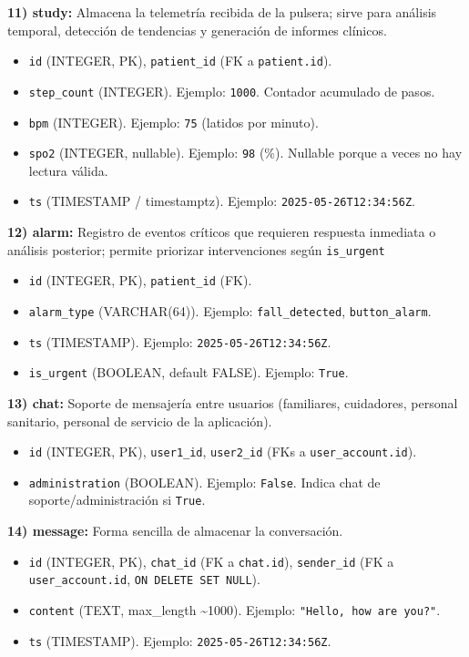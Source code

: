 \documentclass[12pt, a4paper]{article}
\begin{document}
\textbf{11) study:} Almacena la telemetría recibida de la pulsera; sirve para análisis temporal, detección de tendencias y generación de informes clínicos.
\begin{itemize}
	\item \texttt{id} (INTEGER, PK), \texttt{patient\_id} (FK a \texttt{patient.id}).
	\item \texttt{step\_count} (INTEGER). Ejemplo: \texttt{1000}. Contador acumulado de pasos.
	\item \texttt{bpm} (INTEGER). Ejemplo: \texttt{75} (latidos por minuto).
	\item \texttt{spo2} (INTEGER, nullable). Ejemplo: \texttt{98} (\%). Nullable porque a veces no hay lectura válida.
	\item \texttt{ts} (TIMESTAMP / timestamptz). Ejemplo: \texttt{2025-05-26T12:34:56Z}.
\end{itemize}

\textbf{12) alarm:} Registro de eventos críticos que requieren respuesta inmediata o análisis posterior; permite priorizar intervenciones según \texttt{is\_urgent}
\begin{itemize}
	\item \texttt{id} (INTEGER, PK), \texttt{patient\_id} (FK).
	\item \texttt{alarm\_type} (VARCHAR(64)). Ejemplo: \texttt{fall\_detected}, \texttt{button\_alarm}.
	\item \texttt{ts} (TIMESTAMP). Ejemplo: \texttt{2025-05-26T12:34:56Z}.
	\item \texttt{is\_urgent} (BOOLEAN, default FALSE). Ejemplo: \texttt{True}.
\end{itemize}


\textbf{13) chat:} Soporte de mensajería entre usuarios (familiares, cuidadores, personal sanitario, personal de servicio de la aplicación). 
\begin{itemize}
	\item \texttt{id} (INTEGER, PK), \texttt{user1\_id}, \texttt{user2\_id} (FKs a \texttt{user\_account.id}).
	\item \texttt{administration} (BOOLEAN). Ejemplo: \texttt{False}. Indica chat de soporte/administración si \texttt{True}.
\end{itemize}


\textbf{14) message:} Forma sencilla de almacenar la conversación.
\begin{itemize}
	\item \texttt{id} (INTEGER, PK), \texttt{chat\_id} (FK a \texttt{chat.id}), \texttt{sender\_id} (FK a \texttt{user\_account.id}, \texttt{ON DELETE SET NULL}).
	\item \texttt{content} (TEXT, max\_length \textasciitilde 1000). Ejemplo: \texttt{"Hello, how are you?"}.
	\item \texttt{ts} (TIMESTAMP). Ejemplo: \texttt{2025-05-26T12:34:56Z}.
\end{itemize}
\end{document}
